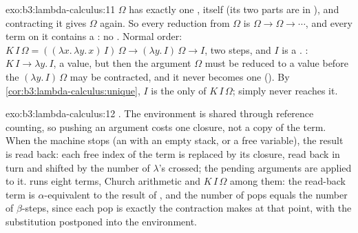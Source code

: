 \begin{solution}{exo:b3:lambda-calculus:11}
$\Omega$ has exactly one , itself (its two parts are  in ), and contracting it gives $\Omega$ again. So every reduction from $\Omega$ is $\Omega \to \Omega \to \cdots$, and every term on it contains a : no . Normal order: $K\,I\,\Omega = ((\lambda x.\,\lambda y.\,x)\,I)\,\Omega \to (\lambda y.\,I)\,\Omega \to I$, two steps, and $I$ is a . : $K\,I \to \lambda y.\,I$, a value, but then the argument $\Omega$ must be reduced to a value before the  $(\lambda y.\,I)\,\Omega$ may be contracted, and it never becomes one (). By \cref{cor:b3:lambda-calculus:unique}, $I$ is the only  of $K\,I\,\Omega$;  simply never reaches it.
\end{solution}

\begin{solution}{exo:b3:lambda-calculus:12}
. The environment is shared through reference counting, so pushing an argument costs one closure, not a copy of the term. When the machine stops (an  with an empty stack, or a free variable), the result is read back: each free index of the term is replaced by its closure, read back in turn and shifted by the number of $\lambda$'s crossed; the pending arguments are applied to it.  runs eight terms, Church arithmetic and $K\,I\,\Omega$ among them: the read-back term is $\alpha$-equivalent to the result of , and the number of pops equals the number of $\beta$-steps, since each pop is exactly the contraction  makes at that point, with the substitution postponed into the environment.
\end{solution}


